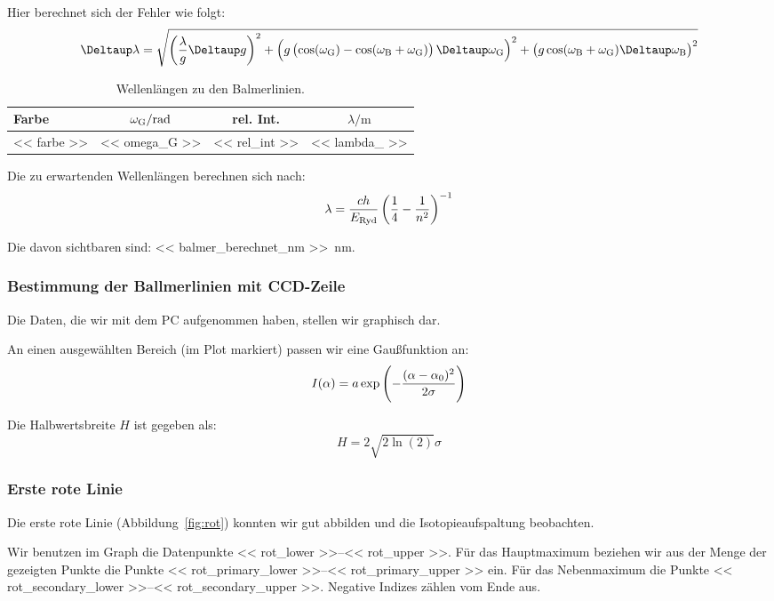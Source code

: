 Hier berechnet sich der Fehler wie folgt:
\[
    \Deltaup \lambda
    =
    \sqrt{
        \del{\frac{\lambda}g \Deltaup g}^2
        +
        \del{g \del{\cos(\omegaG) - \cos(\omegaB + \omegaG)} \Deltaup
        \omegaG}^2
        +
        \del{g \cos(\omegaB + \omegaG) \Deltaup \omegaB}^2
    }
\]

\begin{table}[htbp]
    \centering
    \begin{tabular}{lSS|S}
        Farbe &
        {$\omega_\text G / \si\radian$} &
        {rel. Int.} &
        {$\lambda / \si{\meter}$} \\
        \midrule
        << farbe >> & << omega_G >> & << rel_int >> & <<
        lambda_ >> \\
    \end{tabular}
    \caption{%
        Wellenlängen zu den Balmerlinien.
    }
    \label{tab:balmer-okular}
\end{table}

Die zu erwartenden Wellenlängen berechnen sich nach:
\[
    \lambda = \frac{c h}{E_\text{Ryd}} \del{\frac 14 - \frac 1{n^2}}^{-1}
\]

Die davon sichtbaren sind: \SIlist{<< balmer_berechnet_nm >>}{\nano\meter}.

\subsubsection{Bestimmung der Ballmerlinien mit CCD-Zeile}

Die Daten, die wir mit dem PC aufgenommen haben, stellen wir graphisch dar.

An einen ausgewählten Bereich (im Plot markiert) passen wir eine Gaußfunktion
an:
\[
    I(\alpha) = a \exp\del{- \frac{(\alpha - \alpha_0)^2}{2 \sigma}}
\]

Die Halbwertsbreite $H$ ist gegeben als: \parencite{wikipedia/gaussian_function}
\[
    H = 2 \sqrt{2 \ln(2)} \sigma
\]

\subsubsection{Erste rote Linie}

Die erste rote Linie (Abbildung~\ref{fig:rot}) konnten wir gut abbilden und die
Isotopieaufspaltung beobachten.

Wir benutzen im Graph die Datenpunkte \numrange{<< rot_lower >>}{<< rot_upper
>>}. Für das Hauptmaximum beziehen wir aus der Menge der gezeigten Punkte die
Punkte \numrange{<< rot_primary_lower >>}{<< rot_primary_upper >>} ein. Für das
Nebenmaximum die Punkte \numrange{<< rot_secondary_lower >>}{<<
rot_secondary_upper >>}. Negative Indizes zählen vom Ende aus.

